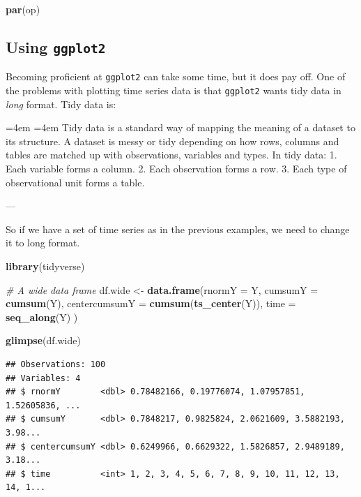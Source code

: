 \documentclass[12pt,]{book}
\newenvironment{Shaded}{\begin{snugshade}}{\end{snugshade}}
\newcommand{\CommentTok}[1]{\textcolor[rgb]{0.56,0.35,0.01}{\textit{#1}}}
\newcommand{\DataTypeTok}[1]{\textcolor[rgb]{0.13,0.29,0.53}{#1}}
\newcommand{\KeywordTok}[1]{\textcolor[rgb]{0.13,0.29,0.53}{\textbf{#1}}}
\newcommand{\NormalTok}[1]{#1}
\newcommand{\StringTok}[1]{\textcolor[rgb]{0.31,0.60,0.02}{#1}}
\renewenvironment{quote}{%
  \par \small \medskip \block
  \leftskip=4em \rightskip=4em%
  \noindent \ignorespaces}{%
  \par \medskip
  }
\begin{document}
\begin{Shaded}
\begin{Highlighting}[]
\KeywordTok{par}\NormalTok{(op)}
\end{Highlighting}
\end{Shaded}

\hypertarget{using-ggplot2}{%
\subsection{\texorpdfstring{Using \texttt{ggplot2}}{Using ggplot2}}\label{using-ggplot2}}

Becoming proficient at \texttt{ggplot2} can take some time, but it does pay off. One of the problems with plotting time series data is that \texttt{ggplot2} wants tidy data in \emph{long} format. Tidy data is:

\begin{quote}
Tidy data is a standard way of mapping the meaning of a dataset to its structure. A dataset is
messy or tidy depending on how rows, columns and tables are matched up with observations,
variables and types. In tidy data:
1. Each variable forms a column.
2. Each observation forms a row.
3. Each type of observational unit forms a table.

---\citet{wickham2014a}
\end{quote}

So if we have a set of time series as in the previous examples, we need to change it to long format.

\begin{Shaded}
\begin{Highlighting}[]
\KeywordTok{library}\NormalTok{(tidyverse)}

\CommentTok{# A wide data frame}
\NormalTok{df.wide <-}\StringTok{ }\KeywordTok{data.frame}\NormalTok{(}\DataTypeTok{rnormY        =}\NormalTok{ Y,}
                      \DataTypeTok{cumsumY       =} \KeywordTok{cumsum}\NormalTok{(Y), }
                      \DataTypeTok{centercumsumY =} \KeywordTok{cumsum}\NormalTok{(}\KeywordTok{ts_center}\NormalTok{(Y)),}
                      \DataTypeTok{time          =} \KeywordTok{seq_along}\NormalTok{(Y)}
\NormalTok{                      )}

\KeywordTok{glimpse}\NormalTok{(df.wide)}
\end{Highlighting}
\end{Shaded}

\begin{verbatim}
## Observations: 100
## Variables: 4
## $ rnormY        <dbl> 0.78482166, 0.19776074, 1.07957851, 1.52605836, ...
## $ cumsumY       <dbl> 0.7848217, 0.9825824, 2.0621609, 3.5882193, 3.98...
## $ centercumsumY <dbl> 0.6249966, 0.6629322, 1.5826857, 2.9489189, 3.18...
## $ time          <int> 1, 2, 3, 4, 5, 6, 7, 8, 9, 10, 11, 12, 13, 14, 1...
\end{verbatim}
\end{document}

